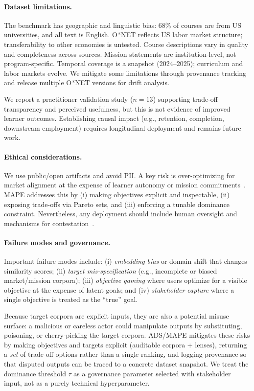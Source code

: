 \documentclass[sigconf,review]{acmart}
\newcommand{\ADS}{\textsc{ADS}\xspace}
\newcommand{\MAPE}{\textsc{MAPE}\xspace}
\begin{document}
\paragraph{Dataset limitations.}
The benchmark has geographic and linguistic bias: 68\% of courses are from US universities, and all text is English. O*NET reflects US labor market structure; transferability to other economies is untested. Course descriptions vary in quality and completeness across sources. Mission statements are institution-level, not program-specific. Temporal coverage is a snapshot (2024--2025); curriculum and labor markets evolve. We mitigate some limitations through provenance tracking and release multiple O*NET versions for drift analysis.

We report a practitioner validation study ($n{=}13$) supporting trade-off transparency and perceived usefulness, but this is not evidence of improved learner outcomes. Establishing causal impact (e.g., retention, completion, downstream employment) requires longitudinal deployment and remains future work.

\paragraph{Ethical considerations.}
We use public/open artifacts and avoid PII. A key risk is over-optimizing for market alignment at the expense of learner autonomy or mission commitments~\cite{ekstrand2019fairness}. \MAPE addresses this by (i) making objectives explicit and inspectable, (ii) exposing trade-offs via Pareto sets, and (iii) enforcing a tunable dominance constraint. Nevertheless, any deployment should include human oversight and mechanisms for contestation~\cite{alfrink2023contestable,dignum2025contesting}.

\paragraph{Failure modes and governance.}
Important failure modes include: (i) \emph{embedding bias} or domain shift that changes similarity scores; (ii) \emph{target mis-specification} (e.g., incomplete or biased market/mission corpora); (iii) \emph{objective gaming} where users optimize for a visible objective at the expense of latent goals; and (iv) \emph{stakeholder capture} where a single objective is treated as the ``true'' goal.

Because target corpora are explicit inputs, they are also a potential misuse surface: a malicious or careless actor could manipulate outputs by substituting, poisoning, or cherry-picking the target corpora. \ADS/\MAPE mitigates these risks by making objectives and targets explicit (auditable corpora + lenses), returning a \emph{set} of trade-off options rather than a single ranking, and logging provenance so that disputed outputs can be traced to a concrete dataset snapshot. We treat the dominance threshold $\tau$ as a governance parameter selected with stakeholder input, not as a purely technical hyperparameter.
\end{document}
